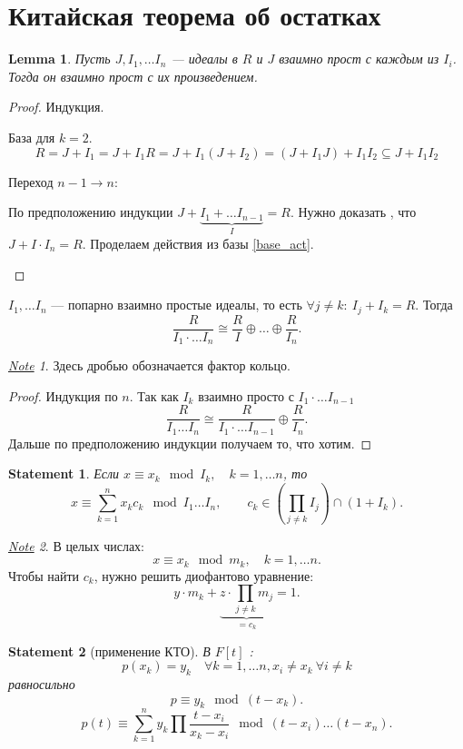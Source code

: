 \documentclass[11pt]{book}
\newcommand{\slim}{\sum\limits}
\theoremstyle{definition}
\theoremstyle{plain}
\theoremstyle{plain}
\newtheorem{lm}{Lemma}
\newtheorem{st}{Statement}
\theoremstyle{definition}
\theoremstyle{remark}
\newtheorem*{note}{\underline{Note}}
\begin{document}
\section{Китайская теорема об остатках}
\begin{lm}
    Пусть $ J, I_1, \ldots I_n $ ---  идеалы в $ R$ и $ J$ взаимно прост с каждым из  $ I_i$. Тогда он взаимно прост с их произведением.
\end{lm}
\begin{proof}
    Индукция.
    \begin{description}
	\item
	    База для $ k=2$.
	    \begin{equation}\label{base_act}
		R = J + I_1 = J + I_1R = J + I_1(J + I_2) = (J + I_1 J) + I_1I_2 \subseteq J + I_1I_2
	    \end{equation}
	\item
	    Переход $ n-1 \to  n$:

	    По предположению индукции $ J + \underbrace{I_1 + \ldots  I_{n-1}}_{I} = R$. Нужно доказать , что $ J + I \cdot I_n = R$.
	    Проделаем действия из базы \ref{base_act}.
    \end{description}
\end{proof}
\begin{thm}
    $ I_1, \ldots  I_n$ --- попарно взаимно простые идеалы, то есть $ \forall  j \ne k:~ I_j + I_k = R$.
    Тогда \[
	\frac{R}{I_1\cdot \ldots I_n } \cong \frac{R}{I} \oplus \ldots  \oplus \frac{R}{I_n}
    .\]
    \begin{note}
	Здесь дробью обозначается фактор кольцо.
    \end{note}
\end{thm}
\begin{proof}
    Индукция по $ n$.
    Так как $ I_k$ взаимно просто с  $ I_1\cdot \ldots I_{n-1}$
    \[
	\frac{R}{I_1 \ldots I_n} \cong \frac{R}{I_1 \cdot \ldots I_{n-1} } \oplus \frac{R}{I_n}
    .\]
    Дальше по предположению индукции получаем то, что хотим.
\end{proof}
\begin{st}
    Если $ x \equiv x_k \mod I_k, \quad k = 1, \ldots n$, то
    \[
	x \equiv \slim_{k=1}^{n} x_k c_k \mod I_1 \ldots I_n, \qquad c_k \in  \left(\prod_{j \ne k} I_j\right) \cap (1 + I_k)
    .\]
\end{st}
\begin{note}
    В целых числах:
    \[
	x \equiv x_k \mod m_k, \quad k = 1, \ldots  n
    .\]
    Чтобы найти $ c_k$, нужно решить диофантово уравнение:
    \[
	y \cdot m_k + \underbrace{z \cdot \prod_{j \ne k} m_j}_{=c_k} = 1
    .\]
\end{note}
\begin{st}[применение КТО]
    В $ F[t]$ :
    \[
	p(x_k) = y_k \quad \forall  k = 1, \ldots n, x_i \ne x_k  ~ \forall  i \ne k
    \]
    равносильно
    \[
	p \equiv y_k \mod (t - x_k)
    .\]
    \[
	p(t) \equiv \slim_{k=1}^{n} y_k \prod \frac{t -x_i}{x_k - x_i} \mod (t - x_i) \ldots (t - x_n)
    .\]
\end{st}
\end{document}
